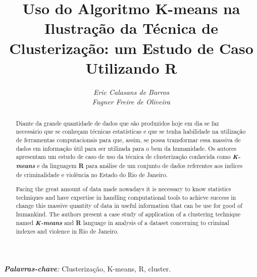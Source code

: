 \documentclass[a4paper, 12pt]{article}\usepackage[]{graphicx}\usepackage[]{color}
\title{\textbf{Uso do Algoritmo K-means na Ilustração da Técnica de Clusterização:  um Estudo de Caso Utilizando R}}
\author{\textit{Eric Calasans de Barros}\\\textit{Fagner Freire de Oliveira}}
\begin{document}
	\maketitle
	
	{%
		\begin{abstract}
			Diante da grande quantidade de dados que são produzidos hoje em dia se faz necessário que se conheçam técnicas estatísticas e que se tenha habilidade na utilização de ferramentas computacionais para que, assim, se possa transformar essa massiva de dados em informação útil para ser utilizada para o bem da humanidade.  Os autores apresentam um estudo de caso de uso da técnica de clusterização conhecida como \textbf{\textit{K-means}} e da linguagem \textbf{R} para análise de um conjunto de dados referentes aos índices de criminalidade e violência no Estado do Rio de Janeiro.
		\end{abstract}
	}

	{%
		\begin{abstract}
			Facing the great amount of data made nowadays it is necessary to know statistics techniques and have expertise in handling computational tools to achieve success in change this massive quantity of data in useful information that can be use for good of humankind.  The authors present a case study of application of a clustering technique named \textit{\textbf{K-means}} and \textbf{R} language in analysis of a dataset concerning to criminal indexes and violence in Rio de Janeiro.
		\end{abstract}	
	}
	\vspace{1cm}
	\textit{\textbf{Palavras-chave}:} Clusterização, K-means, R, cluster.
	
	
\end{document}
